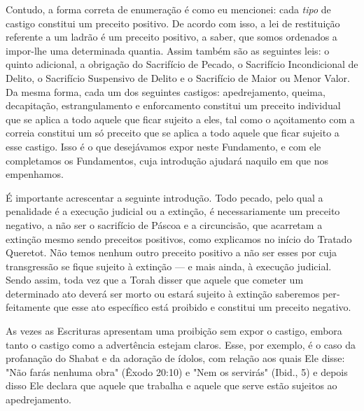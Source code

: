 \begin{itemize}
\begin{enumrate}
\begin{itemize}
Contudo, a forma correta de enumeração é como eu mencionei: ca­da
\emph{tipo} de castigo constitui um preceito positivo. De acordo com
isso, a lei de restituição referente a um ladrão é um preceito positivo,
a saber, que somos ordenados a impor-lhe uma determinada quantia. Assim
também são as seguin­tes leis: o quinto adicional, a obrigação do
Sacrifício de Pecado, o Sacrifício
Incondicional de Delito, o Sacrifício Suspensivo de Delito e o
Sacrifício de Maior ou Menor Valor. Da mesma forma, cada um dos
seguintes castigos: apedreja­mento, queima, decapitação, estrangulamento
e enforcamento constitui um pre­ceito individual que se aplica a todo
aquele que ficar sujeito a eles, tal como o açoitamento com a correia
constitui um só preceito que se aplica a todo aquele que ficar sujeito a
esse castigo. Isso é o que desejávamos expor neste Funda­mento, e com
ele completamos os Fundamentos, cuja introdução ajudará na­quilo em que
nos empenhamos.

É importante acrescentar a seguinte introdução. Todo pecado, pelo qual a
penalidade é a execução judicial ou a extinção, é necessariamente um
preceito negativo, a não ser o sacrifício de Páscoa e a circuncisão, que
acarre­tam a extinção mesmo sendo preceitos positivos, como explicamos
no início do Tratado Queretot. Não temos nenhum outro preceito positivo
a não ser es­ses por cuja transgressão se fique sujeito à extinção --- e
mais ainda, à execução judicial. Sendo assim, toda vez que a Torah
disser que aquele que cometer um determinado ato deverá ser morto ou
estará sujeito à extinção saberemos per­feitamente que esse ato
específico está proibido e constitui um preceito negativo.

As vezes as Escrituras apresentam uma proibição sem expor o casti­go,
embora tanto o castigo como a advertência estejam claros. Esse, por
exem­plo, é o caso da profanação do Shabat e da adoração de ídolos, com
relação aos quais Ele disse: "Não farás nenhuma obra" (Êxodo 20:10) e
"Nem os servi­rás" (Ibid., 5) e depois disso Ele declara que aquele que
trabalha e aquele que serve estão sujeitos ao apedrejamento.


\end{itemize}
\end{enumrate}
\end{itemize}
